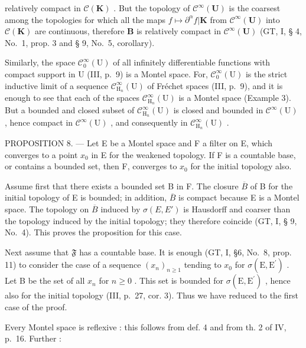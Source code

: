 relatively compact in \(\mathcal{C}(\mathbf{K})\) . But the topology of \(\mathcal{C}^{\infty}(\mathbf{U})\) is the coarsest among the topologies for which all the maps \(f\mapsto \partial^{\alpha}f|\mathbf{K}\) from \(\mathcal{C}^{\infty}(\mathbf{U})\) into \(\mathcal{C}(\mathbf{K})\) are continuous, therefore \(\mathbf{B}\) is relatively compact in \(\mathcal{C}^{\infty}(\mathbf{U})\) (GT, I, § 4, No.~1, prop. 3 and § 9, No.~5, corollary).

Similarly, the space \(\mathcal{C}_0^\infty (\mathrm{U})\) of all infinitely differentiable functions with compact support in U (III, p.~9) is a Montel space. For, \(\mathcal{C}_0^\infty (\mathrm{U})\) is the strict inductive limit of a sequence \(\mathcal{C}_{\mathrm{H}_n}^\infty (\mathrm{U})\) of Fréchet spaces (III, p.~9), and it is enough to see that each of the spaces \(\mathcal{C}_{\mathrm{H}_n}^\infty (\mathrm{U})\) is a Montel space (Example 3). But a bounded and closed subset of \(\mathcal{C}_{\mathrm{H}_n}^\infty (\mathrm{U})\) is closed and bounded in \(\mathcal{C}^{\infty}(\mathrm{U})\) , hence compact in \(\mathcal{C}^{\infty}(\mathrm{U})\) , and consequently in \(\mathcal{C}_{\mathrm{H}_n}^\infty (\mathrm{U})\) .

PROPOSITION 8. --- Let E be a Montel space and F a filter on E, which converges to a point \(x_{0}\) in E for the weakened topology. If F is a countable base, or contains a bounded set, then F, converges to \(x_{0}\) for the initial topology also.

Assume first that there exists a bounded set B in F. The closure \(\overline{B}\) of B for the initial topology of E is bounded; in addition, \(\overline{B}\) is compact because E is a Montel space. The topology on \(\overline{B}\) induced by \(\sigma(E, E')\) is Hausdorff and coarser than the topology induced by the initial topology; they therefore coincide (GT, I, § 9, No.~4). This proves the proposition for this case.

Next assume that \(\mathfrak{F}\) has a countable base. It is enough (GT, I, §6, No.~8, prop. 11) to consider the case of a sequence \((x_{n})_{n\geqslant 1}\) tending to \(x_0\) for \(\sigma (\mathrm{E},\mathrm{E}^{\prime})\) . Let B be the set of all \(x_{n}\) for \(n\geqslant 0\) . This set is bounded for \(\sigma (\mathrm{E},\mathrm{E}^{\prime})\) , hence also for the initial topology (III, p.~27, cor. 3). Thus we have reduced to the first case of the proof.

Every Montel space is reflexive : this follows from def. 4 and from th. 2 of IV, p.~16. Further :

